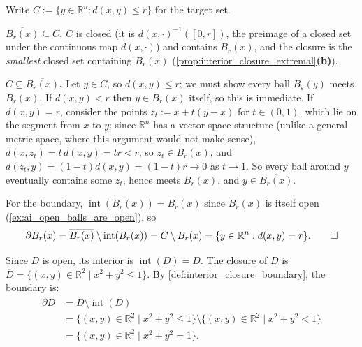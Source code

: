 \begin{exercisesolution}
\label{sol:closure_boundary_of_ball}
Write $C := \{y \in \mathbb{R}^n : d(x,y) \leq r\}$ for the target set.

\textbf{$\overline{B_r(x)} \subseteq C$.} $C$ is closed (it is $d(x,\cdot)^{-1}([0,r])$, the
preimage of a closed set under the continuous map $d(x,\cdot)$) and contains $B_r(x)$, and the
closure is the \emph{smallest} closed set containing $B_r(x)$
(\cref{prop:interior_closure_extremal}\textbf{(b)}).

\textbf{$C \subseteq \overline{B_r(x)}$.} Let $y \in C$, so $d(x,y) \leq r$; we must show every
ball $B_\varepsilon(y)$ meets $B_r(x)$. If $d(x,y) < r$ then $y \in B_r(x)$ itself, so this is
immediate. If $d(x,y) = r$, consider the points $z_t := x + t(y-x)$ for $t \in (0,1)$, which lie
on the segment from $x$ to $y$: since $\mathbb{R}^n$ has a vector space structure (unlike a
general metric space, where this argument would not make sense),
$d(x,z_t) = t\,d(x,y) = tr < r$, so $z_t \in B_r(x)$, and $d(z_t,y) = (1-t)d(x,y) = (1-t)r \to 0$
as $t \to 1$. So every ball around $y$ eventually contains some $z_t$, hence meets $B_r(x)$, and
$y \in \overline{B_r(x)}$.

For the boundary, $\operatorname{int}(B_r(x)) = B_r(x)$ since $B_r(x)$ is itself open
(\cref{ex:ai_open_balls_are_open}), so
\[\partial B_r(x) = \overline{B_r(x)} \setminus \operatorname{int}(B_r(x))
  = C \setminus B_r(x) = \{y \in \mathbb{R}^n : d(x,y) = r\}. \qedhere\]
\end{exercisesolution}

\begin{exercisesolution}
\label{sol:ai_disk_boundary}
Since $D$ is open, its interior is $\operatorname{int}(D) = D$. The closure of $D$ is $\overline{D} = \{(x,y) \in \mathbb{R}^2 \mid x^2 + y^2 \leq 1\}$. By \cref{def:interior_closure_boundary}, the boundary is:
\begin{align*}
\partial D &= \overline{D} \setminus \operatorname{int}(D) \\
&= \{(x,y) \in \mathbb{R}^2 \mid x^2 + y^2 \leq 1\} \setminus \{(x,y) \in \mathbb{R}^2 \mid x^2 + y^2 < 1\} \\
&= \{(x,y) \in \mathbb{R}^2 \mid x^2 + y^2 = 1\}.
\end{align*}
\end{exercisesolution}


